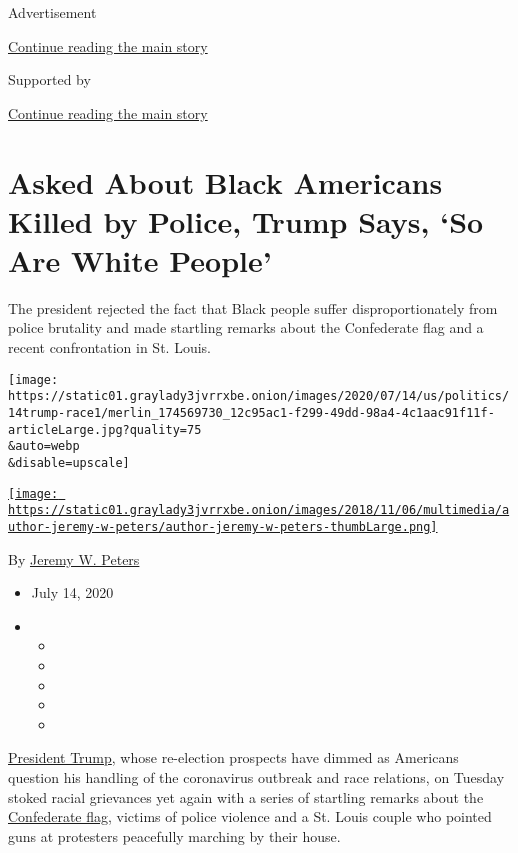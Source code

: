 Advertisement

\protect\hyperlink{after-top}{Continue reading the main story}

Supported by

\protect\hyperlink{after-sponsor}{Continue reading the main story}

\hypertarget{asked-about-black-americans-killed-by-police-trump-says-so-are-white-people}{%
\section{Asked About Black Americans Killed by Police, Trump Says, `So
Are White
People'}\label{asked-about-black-americans-killed-by-police-trump-says-so-are-white-people}}

The president rejected the fact that Black people suffer
disproportionately from police brutality and made startling remarks
about the Confederate flag and a recent confrontation in St. Louis.

\texttt{[image: https://static01.graylady3jvrrxbe.onion/images/2020/07/14/us/politics/14trump-race1/merlin\_174569730\_12c95ac1-f299-49dd-98a4-4c1aac91f11f-articleLarge.jpg?quality=75\\\&auto=webp\\\&disable=upscale]}

\href{https://www.nytimes3xbfgragh.onion/by/jeremy-w-peters}{\texttt{[image: https://static01.graylady3jvrrxbe.onion/images/2018/11/06/multimedia/author-jeremy-w-peters/author-jeremy-w-peters-thumbLarge.png]}}

By \href{https://www.nytimes3xbfgragh.onion/by/jeremy-w-peters}{Jeremy
W. Peters}

\begin{itemize}
\item
  July 14, 2020
\item
  \begin{itemize}
  \item
  \item
  \item
  \item
  \item
  \end{itemize}
\end{itemize}

\href{https://www.nytimes3xbfgragh.onion/interactive/2020/us/elections/donald-trump.html}{President
Trump}, whose re-election prospects have dimmed as Americans question
his handling of the coronavirus outbreak and race relations, on Tuesday
stoked racial grievances yet again with a series of startling remarks
about the
\href{https://www.nytimes3xbfgragh.onion/2020/07/17/us/politics/pentagon-trump-confederate-symbols.html}{Confederate
flag}, victims of police violence and a St. Louis couple who pointed
guns at protesters peacefully marching by their house.

